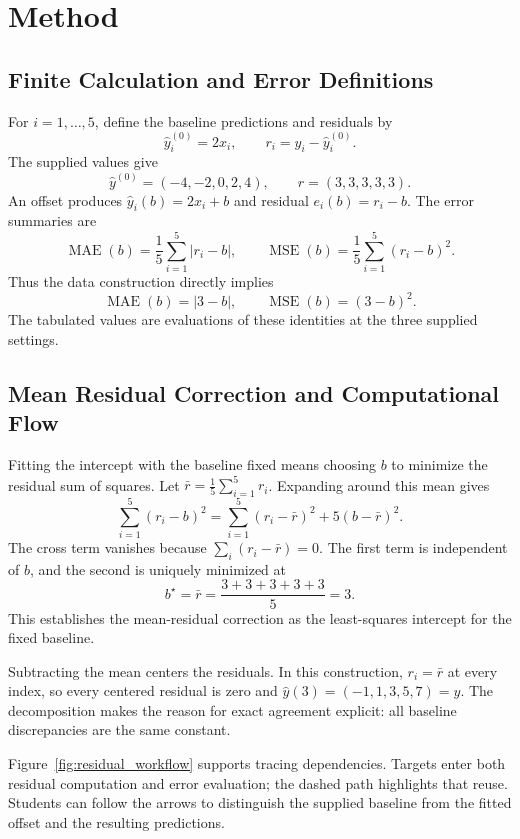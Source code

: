 \documentclass[11pt]{article}
\begin{document}
\section{Method}

\subsection{Finite Calculation and Error Definitions}

For $i=1,\ldots,5$, define the baseline predictions and residuals by
\[
\hat y_i^{(0)}=2x_i,\qquad r_i=y_i-\hat y_i^{(0)}.
\]
The supplied values give
\[
\hat y^{(0)}=(-4,-2,0,2,4),\qquad r=(3,3,3,3,3).
\]
An offset produces $\hat y_i(b)=2x_i+b$ and residual
$e_i(b)=r_i-b$. The error summaries are
\[
\operatorname{MAE}(b)=\frac{1}{5}\sum_{i=1}^{5}|r_i-b|,
\qquad
\operatorname{MSE}(b)=\frac{1}{5}\sum_{i=1}^{5}(r_i-b)^2.
\]
Thus the data construction directly implies
\[
\operatorname{MAE}(b)=|3-b|,
\qquad
\operatorname{MSE}(b)=(3-b)^2.
\]
The tabulated values are evaluations of these identities at the three supplied settings.

\subsection{Mean Residual Correction and Computational Flow}

Fitting the intercept with the baseline fixed means choosing $b$ to minimize the residual sum of squares. Let
$\bar r=\frac{1}{5}\sum_{i=1}^{5}r_i$. Expanding around this mean gives
\[
\sum_{i=1}^{5}(r_i-b)^2
=
\sum_{i=1}^{5}(r_i-\bar r)^2
+5(b-\bar r)^2.
\]
The cross term vanishes because $\sum_i(r_i-\bar r)=0$.
The first term is independent of $b$, and the second is uniquely minimized at
\[
b^\star=\bar r=\frac{3+3+3+3+3}{5}=3.
\]
This establishes the mean-residual correction as the least-squares intercept for the fixed baseline.

Subtracting the mean centers the residuals. In this construction,
$r_i=\bar r$ at every index, so every centered residual is zero and
$\hat y(3)=(-1,1,3,5,7)=y$. The decomposition makes the reason for exact agreement explicit: all baseline discrepancies are the same constant.

Figure~\ref{fig:residual_workflow} supports tracing dependencies. Targets enter both residual computation and error evaluation; the dashed path highlights that reuse. Students can follow the arrows to distinguish the supplied baseline from the fitted offset and the resulting predictions.
\end{document}
